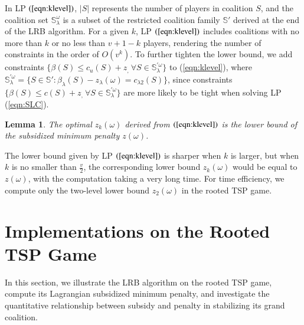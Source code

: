 \documentclass[authoryear,review,12pt]{elsarticle}
\newtheorem{lemma}{Lemma}
\begin{document}
In LP $(\ref{eqn:klevel})$, $|S|$ represents the number of players in coalition $S$, and the coalition set $\mathbb{S}^{\omega}_{\lambda}$ is a subset of the restricted coalition family $\mathbb{S}'$ derived at the end of the LRB algorithm. For a given $k$, LP $(\ref{eqn:klevel})$ includes coalitions with no more than $k$ or no less than $v+1-k$ players, rendering the number of constraints in the order of $O(v^k)$.
To further tighten the lower bound, we add constraints $\big\{\beta(S) \leq c_{u}(S)+z_,~\forall S \in \mathbb{S}^{'\omega}_{\lambda} \big\}$ to (\ref{eqn:klevel}), where $\mathbb{S}^{'\omega}_{\lambda} = \big\{ S \in \mathbb{S}': \beta_{\lambda}(S) - z_{\lambda}(\omega) =  c_{\lambda2}(S) \big\}$, since constraints $\big\{\beta(S) \leq c(S)+z_,~\forall S \in \mathbb{S}^{'\omega}_{\lambda} \big\}$ are more likely to be tight when solving LP (\ref{eqn:SLC}).


\begin{lemma}\label{lemma:lower}
The optimal $z_k(\omega)$ derived from $(\ref{eqn:klevel})$ is the lower bound of the subsidized minimum penalty $z(\omega)$.
\end{lemma}

The lower bound given by LP $(\ref{eqn:klevel})$ is sharper when $k$ is larger, but when $k$ is no smaller than $\frac{v}{2}$, the corresponding lower bound $z_k(\omega)$ would be equal to $z(\omega)$, with the computation taking a very long time. For time efficiency, we compute only the two-level lower bound $z_2(\omega)$ in the rooted TSP game.



\section{Implementations on the Rooted TSP Game}\label{section:TSP}
In this section, we illustrate the LRB algorithm on the rooted TSP game, compute its Lagrangian subsidized minimum penalty, and investigate the quantitative relationship between subsidy and penalty in stabilizing its grand coalition.
\end{document}
